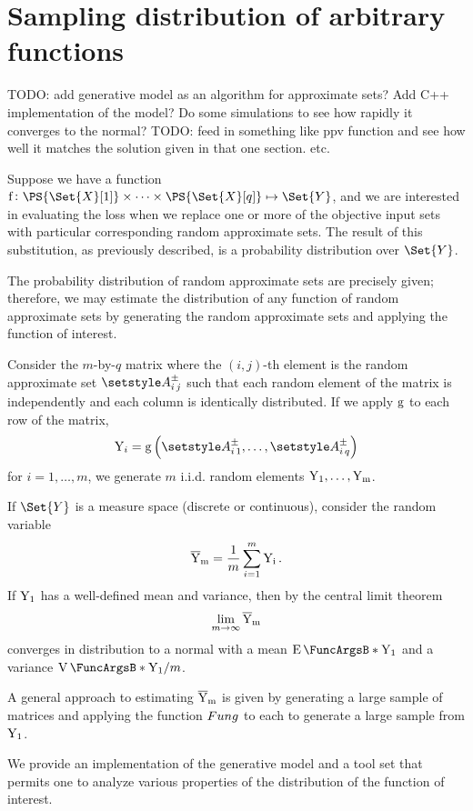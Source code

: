 \documentclass[10pt,final,hidelinks]{article}
\numberwithin{equation}{section}
\begin{document}
{\section{Sampling distribution of arbitrary functions}
\label{app:samp}
TODO: add generative model as an algorithm for approximate sets? Add C++ implementation of the model? Do some simulations to see how rapidly it converges to the normal?
TODO: feed in something like ppv function and see how well it matches the solution given in that one section. etc.

Suppose we have a function $\Fun{f} \colon \PS{\Set{X}[1]} \times \cdots \times \PS{\Set{X}[q]} \mapsto \Set{Y}$, and we are interested in evaluating the loss when we replace one or more of the objective input sets with particular corresponding random approximate sets.
The result of this substitution, as previously described, is a probability distribution over $\Set{Y}$.

The probability distribution of random approximate sets are precisely given; therefore, we may estimate the distribution of any function of random approximate sets by generating the random approximate sets and applying the function of interest.

Consider the $m$-by-$q$ matrix where the $(i,j)$-th element is the random approximate set $\ASet{A}_{i\,j}$ such that each random element of the matrix is independently and each column is identically distributed.
If we apply $\Fun{g}$ to each row of the matrix,
\begin{equation}
\RV{Y}_i = \Fun{g}\left(\ASet{A}_{i\,1},\ldots,\ASet{A}_{i\,q}\right)
\end{equation}
for $i=1,\ldots,m$, we generate $m$ i.i.d. random elements $\mathrm{Y_1},\ldots,\mathrm{Y_m}$.

If $\Set{Y}$ is a measure space (discrete or continuous), consider the random variable
\begin{equation}
\mathrm{\overline{Y}_m} = \frac{1}{m} \sum_{i=1}^{m} \mathrm{Y_i}\,.
\end{equation}
If $\mathrm{Y_1}$ has a well-defined mean and variance, then by the central limit theorem
\begin{equation}
\lim_{m \to \infty} \mathrm{\overline{Y}_m}
\end{equation}
converges in distribution to a normal with a mean $\Expect{\RV{Y_1}}$ and a variance $\Var{\RV{Y_1}} / m$.

A general approach to estimating $\mathrm{\overline{Y}_m}$ is given by generating a large sample of matrices and applying the function $\\Fun{g}$ to each to generate a large sample from $\mathrm{Y_1}$.

We provide an implementation of the generative model and a tool set that permits one to analyze various properties of the distribution of the function of interest.
}



\end{document}
